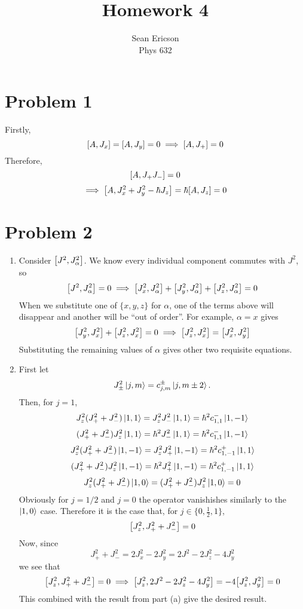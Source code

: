 \documentclass[12pt]{article}
\begin{document}
	
\title{Homework 4}
\author{Sean Ericson \\ Phys 632}
\maketitle

\section*{Problem 1}
Firstly,
\[ \comm{A}{J_x} = \comm{A}{J_y} = 0 \implies \comm{A}{J_+} = 0 \]
Therefore,
\[ \comm{A}{J_+J_-} = 0 \]
\[ \implies \comm{A}{J_x^2 + J_y^2 -\hbar J_z} = \hbar\comm{A}{J_z} = 0 \]

\section*{Problem 2}
\begin{enumerate}[label=(\alph*)]
    \item Consider $\comm{J^2}{J_\alpha^2}$. We know every individual component commutes with $J^2$, so
    \[ \comm{J^2}{J_\alpha^2} = 0 \implies \comm{J_x^2}{J_\alpha^2} + \comm{J_y^2}{J_\alpha^2} + \comm{J_z^2}{J_\alpha^2} = 0 \]
    When we substitute one of $\{x, y, z\}$ for $\alpha$, one of the terms above will disappear and another will be ``out of order''. For example, $\alpha = x$ gives
    \[ \comm{J_y^2}{J_x^2} + \comm{J_z^2}{J_x^2} = 0 \implies \comm{J_z^2}{J_x^2} = \comm{J_x^2}{J_y^2}\]
    Substituting the remaining values of $\alpha$ gives other two requisite equations.

    \item First let
    \[ J_\pm^2\ket{j,m} = c_{j,m}^\pm\ket{j,m\pm 2}. \]
    Then, for $j = 1$,
    \[ J_z^2(J_+^2 + J_-^2)\ket{1,1} = J_z^2J_-^2\ket{1,1} = \hbar^2c_{1,1}^-\ket{1,-1} \]
    \[ (J_+^2 + J_-^2)J_z^2\ket{1,1} = \hbar^2J_-^2\ket{1,1} = \hbar^2c_{1,1}^-\ket{1,-1} \]
    \[ J_z^2(J_+^2 + J_-^2)\ket{1,-1} = J_z^2J_+^2\ket{1,-1} = \hbar^2c_{1,-1}^+\ket{1,1}\]
    \[ (J_+^2 + J_-^2)J_z^2\ket{1,-1} = \hbar^2J_+^2\ket{1,-1} = \hbar^2c_{1,-1}^+\ket{1,1} \]
    \[ J_z^2(J_+^2 + J_-^2)\ket{1,0} = (J_+^2 + J_-^2)J_z^2\ket{1,0} = 0 \]
    Obviously for $j=1/2$ and $j=0$ the operator vanishishes similarly to the $\ket{1,0}$ case. 
    Therefore it is the case that, for $j\in\{0, \frac{1}{2}, 1\}$,
    \[ \comm{J_z^2}{J_+^2 + J_-^2} = 0 \]
    Now, since
    \[ J_+^2 + J_-^2 = 2J_x^2 - 2J_y^2 = 2J^2 - 2J_z^2 - 4J_y^2 \]
    we see that
    \[ \comm{J_z^2}{J_+^2 + J_-^2} = 0 \implies \comm{J_z^2}{2J^2 - 2J_z^2 - 4J_y^2} = -4\comm{J_z^2}{J_y^2} = 0 \]
    This combined with the result from part (a) give the desired result.
\end{enumerate}
\end{document}
